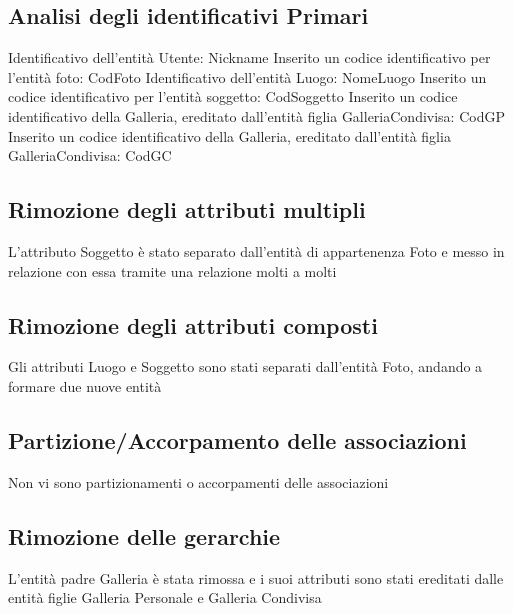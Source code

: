         \subsection{Analisi degli identificativi Primari}
            Identificativo dell’entità Utente: Nickname
            \newline
            Inserito un codice identificativo per l’entità foto: CodFoto
            \newline
            Identificativo dell’entità Luogo: NomeLuogo
            \newline
            Inserito un codice identificativo per l’entità soggetto: CodSoggetto
             \newline
            Inserito un codice identificativo della Galleria, ereditato dall’entità 
            figlia GalleriaCondivisa: CodGP
             \newline
            Inserito un codice identificativo della Galleria, ereditato dall’entità figlia GalleriaCondivisa: CodGC
             \newline
        \subsection{Rimozione degli attributi multipli}
            L’attributo Soggetto è stato separato dall’entità di appartenenza Foto e messo in relazione con essa tramite una relazione molti a molti
        \subsection{Rimozione degli attributi composti}
            Gli attributi Luogo e Soggetto sono stati separati dall’entità Foto, andando a formare due nuove entità
        \subsection{Partizione/Accorpamento delle associazioni}
            Non vi sono partizionamenti o accorpamenti delle associazioni
        \subsection{Rimozione delle gerarchie}
        L’entità padre Galleria è stata rimossa e i suoi attributi sono stati ereditati dalle entità figlie Galleria Personale e Galleria Condivisa
